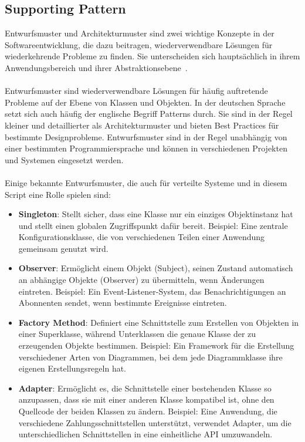 \subsection{Supporting Pattern}

Entwurfsmuster und Architekturmuster sind zwei wichtige Konzepte in der Softwareentwicklung, die dazu beitragen, wiederverwendbare Lösungen für wiederkehrende Probleme zu finden. Sie unterscheiden sich hauptsächlich in ihrem Anwendungsbereich und ihrer Abstraktionsebene~\cite{gamma1994design}.
\\\\
Entwurfsmuster sind wiederverwendbare Lösungen für häufig auftretende Probleme auf der Ebene von Klassen und Objekten. In der deutschen Sprache setzt sich auch häufig der englische Begriff Patterns durch. Sie sind in der Regel kleiner und detaillierter als Architekturmuster und bieten Best Practices für bestimmte Designprobleme. Entwurfsmuster sind in der Regel unabhängig von einer bestimmten Programmiersprache und können in verschiedenen Projekten und Systemen eingesetzt werden.
\\\\
Einige bekannte Entwurfsmuster, die auch für verteilte Systeme und in diesem Script eine Rolle spielen sind:
\begin{itemize}
\item \textbf{Singleton}: Stellt sicher, dass eine Klasse nur ein einziges Objektinstanz hat und stellt einen globalen Zugriffspunkt dafür bereit. Beispiel: Eine zentrale Konfigurationsklasse, die von verschiedenen Teilen einer Anwendung gemeinsam genutzt wird.
\item \textbf{Observer}: Ermöglicht einem Objekt (Subject), seinen Zustand automatisch an abhängige Objekte (Observer) zu übermitteln, wenn Änderungen eintreten. Beispiel: Ein Event-Listener-System, das Benachrichtigungen an Abonnenten sendet, wenn bestimmte Ereignisse eintreten.
\item \textbf{Factory Method}: Definiert eine Schnittstelle zum Erstellen von Objekten in einer Superklasse, während Unterklassen die genaue Klasse der zu erzeugenden Objekte bestimmen. Beispiel: Ein Framework für die Erstellung verschiedener Arten von Diagrammen, bei dem jede Diagrammklasse ihre eigenen Erstellungsregeln hat.
\item \textbf{Adapter}: Ermöglicht es, die Schnittstelle einer bestehenden Klasse so anzupassen, dass sie mit einer anderen Klasse kompatibel ist, ohne den Quellcode der beiden Klassen zu ändern. Beispiel: Eine Anwendung, die verschiedene Zahlungsschnittstellen unterstützt, verwendet Adapter, um die unterschiedlichen Schnittstellen in eine einheitliche API umzuwandeln.
\end{itemize}
